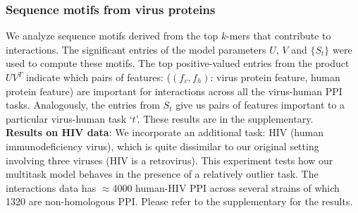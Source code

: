 \documentclass{bioinfo}
\begin{document}







\subsubsection{Sequence motifs from virus proteins}
We analyze sequence motifs derived from the top $k$-mers that contribute to interactions. The significant entries of the model parameters $U$, $V$ and $\{S_t\}$ were used to 
compute these motifs. The top positive-valued entries from the product $U V^T$ indicate which pairs of features: ($(f_v, f_h)$: virus protein feature, human protein feature) are important for interactions across all the virus-human PPI tasks.
Analogously, the entries from $S_t$ give us pairs of features important to a particular virus-human task `$t$'.
These results are in the supplementary.\\


\noindent\textbf{Results on HIV data}: 
We incorporate an additional task: HIV (human immunodeficiency virus), which is quite dissimilar to our original setting involving three viruses (HIV is a retrovirus). This experiment tests how our multitask model behaves in the presence of a relatively outlier task. The interactions data has $\approx$4000 human-HIV PPI across several strains of which 1320 are non-homologous PPI. Please refer to the supplementary for the results.
\end{document}
